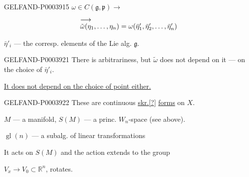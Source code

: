 \begin{GelfandAdjacentEvidence}{GELFAND-P000391}{5}
$\omega\in C (\mathfrak{g},\mathfrak{p})\longrightarrow$
\begin{equation*}
\begin{array}{@{}l@{}}
\longrightarrow\\[-2pt]
\tilde\omega (\eta_1,\dots,\eta_n)
=\omega (\bar\eta'_1,\bar\eta'_2,\dots,\bar\eta'_n)
\end{array}
\end{equation*}
\end{GelfandAdjacentEvidence}

$\bar\eta'_i$ --- the corresp. elements of the Lie alg. $\mathfrak{g}$.


\begin{GelfandAdjacentEvidence}{GELFAND-P000392}{1}
There is arbitrariness, but $\tilde\omega$ does not depend on it --- on the choice of $\bar\eta'_i$.
\end{GelfandAdjacentEvidence}


\underline{It does not depend on the choice of point either.}

\begin{GelfandAdjacentEvidence}{GELFAND-P000392}{2}
These are continuous \underline{skr.[?]} \underline{forms} on $X$.
\end{GelfandAdjacentEvidence}


$M$ --- a manifold, $S (M)$ --- a princ. $W_n$-space (see above).

$\operatorname{gl}(n)$ --- a subalg. of linear transformations

It acts on $S (M)$ and the action extends to the group

$V_x\longrightarrow V_0\subset\mathbb{R}^n$, rotates.

